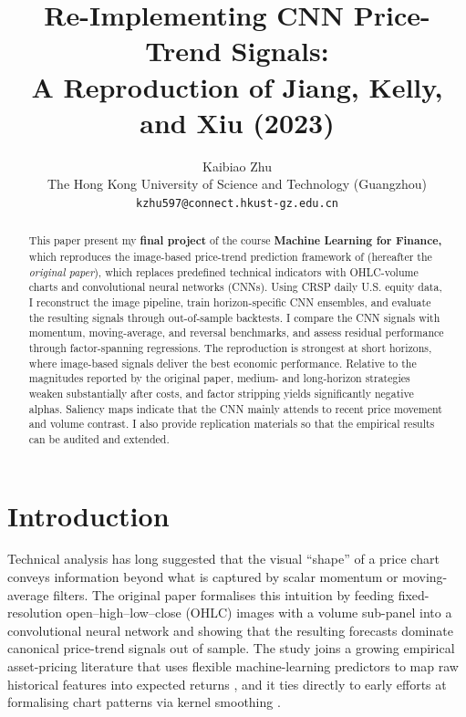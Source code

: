 \documentclass{article}
\title{Re-Implementing CNN Price-Trend Signals:\\
A Reproduction of Jiang, Kelly, and Xiu (2023)}
\author{%
  Kaibiao Zhu \\
  The Hong Kong University of Science and Technology (Guangzhou) \\
  \texttt{kzhu597@connect.hkust-gz.edu.cn} 
}
\begin{document}
\maketitle


\begin{abstract}
This paper present my \textbf{final project} of the course \textbf{Machine Learning for Finance, }which reproduces the image-based price-trend prediction framework of
\citet{jiang2023reimagining} (hereafter the \emph{original paper}), which replaces predefined technical indicators
with OHLC-volume charts and convolutional neural networks (CNNs). Using CRSP
daily U.S. equity data, I reconstruct the image pipeline, train horizon-specific
CNN ensembles, and evaluate the resulting signals through out-of-sample backtests. I compare the CNN signals with momentum,
moving-average, and reversal benchmarks, and assess residual performance through
factor-spanning regressions. The reproduction is strongest at short horizons,
where image-based signals deliver the best economic performance. Relative to
the magnitudes reported by the original paper, medium- and
long-horizon strategies weaken substantially after costs, and factor stripping
yields significantly negative alphas. Saliency
maps indicate that the CNN mainly attends to recent price movement and volume
contrast. I also provide replication materials so that the empirical results
can be audited and extended.
\end{abstract}


\section{Introduction}
\label{sec:intro}

Technical analysis has long suggested that the visual ``shape'' of a price
chart conveys information beyond what is captured by scalar momentum or
moving-average filters. The original paper formalises this intuition
by feeding fixed-resolution open--high--low--close (OHLC) images with a
volume sub-panel into a convolutional neural network and showing that the
resulting forecasts dominate canonical price-trend signals out of sample.
The study joins a growing empirical asset-pricing literature that uses
flexible machine-learning predictors to map raw historical features into
expected returns \citep{gu2020empirical,kelly2019characteristics}, and it
ties directly to early efforts at formalising chart patterns via kernel
smoothing \citep{lo2000foundations}.
\end{document}
